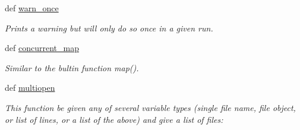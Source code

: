 \begin{DoxyCompactItemize}
\item 
def \hyperlink{namespaceforcebalance_1_1nifty_a26e563ec71ed229c30f3d61d3448c8f1}{warn\-\_\-once}
\begin{DoxyCompactList}\small\item\em \-Prints a warning but will only do so once in a given run. \end{DoxyCompactList}\item 
def \hyperlink{namespaceforcebalance_1_1nifty_a2fc81730e7efa7d138dd86f733507bfc}{concurrent\-\_\-map}
\begin{DoxyCompactList}\small\item\em \-Similar to the bultin function map(). \end{DoxyCompactList}\item 
def \hyperlink{namespaceforcebalance_1_1nifty_a64b7c6ca7afa1c11681f5c2897c55cc3}{multiopen}
\begin{DoxyCompactList}\small\item\em \-This function be given any of several variable types (single file name, file object, or list of lines, or a list of the above) and give a list of files\-: \end{DoxyCompactList}\end{DoxyCompactItemize}
